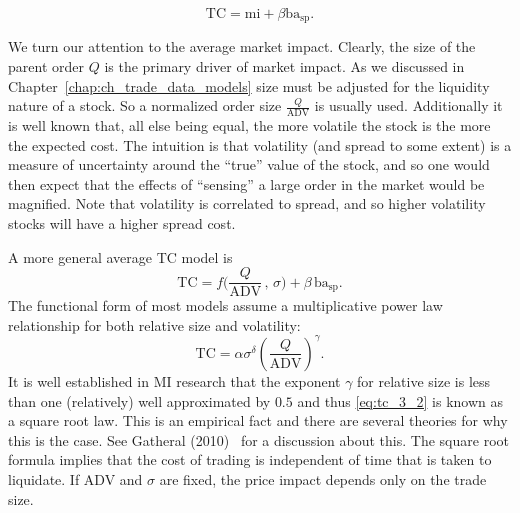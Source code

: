         \begin{equation}\label{eq:tc_3}
        \text{TC}= \text{mi} + \beta \text{ba}_{\text{sp}}.
        \end{equation}


We turn our attention to the average market impact. Clearly, the size of the parent order $Q$ is the primary driver of market impact. As we discussed in Chapter~\ref{chap:ch_trade_data_models} size must be adjusted for the liquidity nature of a stock. So a normalized order size $\frac{Q}{\text{ADV}}$ is usually used. Additionally it is well known that, all else being equal, the more volatile the stock is the more the expected cost. The intuition is that volatility (and spread to some extent) is a measure of  uncertainty around the ``true'' value of the stock, and so one would then expect that the effects of ``sensing'' a large order in the market would be magnified. Note that volatility is correlated to spread, and so higher volatility stocks will have a higher spread cost.


A more general average TC model is
        \begin{equation} \label{eq:tc_3b}
        	\text{TC}= f \big(\frac{Q}{\text{ADV}}\,,\, \sigma \big) + \beta \,\text{ba}_{\text{sp}}.
        \end{equation}
The functional form of most models assume a multiplicative power law relationship for both relative size and volatility:
        \begin{equation} \label{eq:tc_3_2}
	\text{TC}=\alpha  \sigma^{\delta} \left( \frac{Q}{\text{ADV}} \right)^{\gamma}.
        \end{equation}
It is well established in MI research that the exponent $\gamma$ for relative size is less than one (relatively) well approximated by $0.5$ and thus \eqref{eq:tc_3_2} is known as a square root law. This is an empirical fact and there are several theories for why this is the case. See Gatheral (2010)~\cite{gatheral} for a discussion about this. The square root formula implies that the cost of trading is independent of time that is taken to liquidate. If ADV and $\sigma$ are fixed, the price impact depends only on the trade size. 


